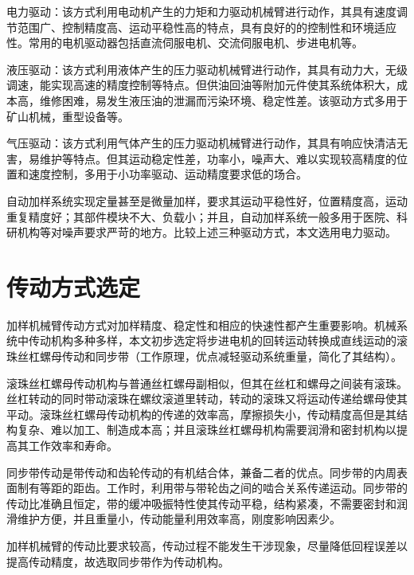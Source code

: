 电力驱动：该方式利用电动机产生的力矩和力驱动机械臂进行动作，其具有速度调节范围广、控制精度高、运动平稳性高的特点，具有良好的的控制性和环境适应性。常用的电机驱动器包括直流伺服电机、交流伺服电机、步进电机等。

液压驱动：该方式利用液体产生的压力驱动机械臂进行动作，其具有动力大，无级调速，能实现高速的精度控制等特点。但供油回油等附加元件使其系统体积大，成本高，维修困难，易发生液压油的泄漏而污染环境、稳定性差。该驱动方式多用于矿山机械，重型设备等。

气压驱动：该方式利用气体产生的压力驱动机械臂进行动作，其具有响应快清洁无害，易维护等特点。但其运动稳定性差，功率小，噪声大、难以实现较高精度的位置和速度控制，多用于小功率驱动、运动精度要求低的场合。

自动加样系统实现定量甚至是微量加样，要求其运动平稳性好，位置精度高，运动重复精度好；其部件模块不大、负载小；并且，自动加样系统一般多用于医院、科研机构等对噪声要求严苛的地方。比较上述三种驱动方式，本文选用电力驱动。
\section{传动方式选定}
加样机械臂传动方式对加样精度、稳定性和相应的快速性都产生重要影响。机械系统中传动机构多种多样，本文初步选定将步进电机的回转运动转换成直线运动的滚珠丝杠螺母传动和同步带（工作原理，优点减轻驱动系统重量，简化了其结构）。

滚珠丝杠螺母传动机构与普通丝杠螺母副相似，但其在丝杠和螺母之间装有滚珠。丝杠转动的同时带动滚珠在螺纹滚道里转动，转动的滚珠又将运动传递给螺母使其平动。滚珠丝杠螺母传动机构的传递的效率高，摩擦损失小，传动精度高但是其结构复杂、难以加工、制造成本高；并且滚珠丝杠螺母机构需要润滑和密封机构以提高其工作效率和寿命。

同步带传动是带传动和齿轮传动的有机结合体，兼备二者的优点。同步带的内周表面制有等距的距齿。工作时，利用带与带轮齿之间的啮合关系传递运动\supercite{bib7}。同步带的传动比准确且恒定，带的缓冲吸振特性使其传动平稳，结构紧凑，不需要密封和润滑维护方便，并且重量小，传动能量利用效率高，刚度影响因素少。

加样机械臂的传动比要求较高，传动过程不能发生干涉现象，尽量降低回程误差以提高传动精度，故选取同步带作为传动机构。













































